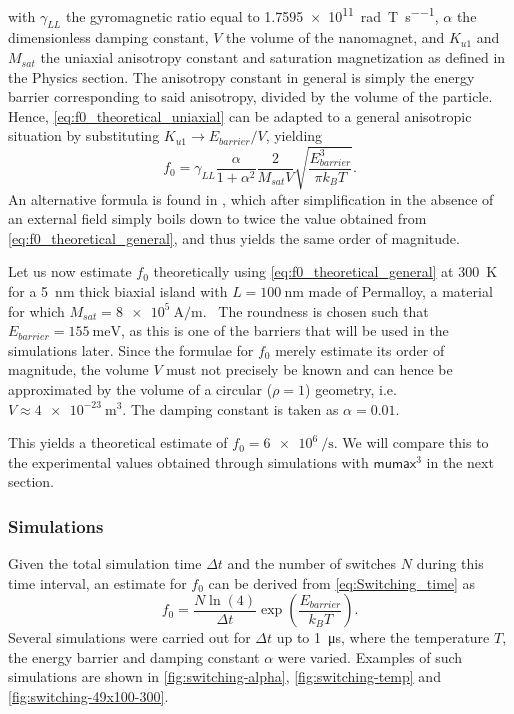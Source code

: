 \documentclass[12pt,a4paper]{article}
\newcommand{\mumax}{$\mathsf{mumax}^3$}
\begin{document}
with $\gamma_{LL}$ the gyromagnetic ratio equal to \SI{1.7595e11}{\radian\per\tesla\per\second}, $\alpha$ the dimensionless damping constant, $V$ the volume of the nanomagnet, and $K_{u1}$ and $M_{sat}$ the uniaxial anisotropy constant and saturation magnetization as defined in the Physics section. The anisotropy constant in general is simply the energy barrier corresponding to said anisotropy, divided by the volume of the particle. Hence, \cref{eq:f0_theoretical_uniaxial} can be adapted to a general anisotropic situation by substituting $K_{u1} \rightarrow E_{barrier}/V$, yielding
\begin{equation}
    f_0 = \gamma_{LL} \frac{\alpha}{1+\alpha^2} \frac{2}{M_{sat} V} \sqrt{\frac{E_{barrier}^3}{\pi k_B T}} \mathrm{.}
    \label{eq:f0_theoretical_general}
\end{equation}
An alternative formula is found in \cite{f0_alternative_Jonathan}, which after simplification in the absence of an external field simply boils down to twice the value obtained from \cref{eq:f0_theoretical_general}, and thus yields the same order of magnitude. \par
Let us now estimate $f_0$ theoretically using \cref{eq:f0_theoretical_general} at \SI{300}{\kelvin} for a \SI{5}{\nano\metre} thick biaxial island with $L=\SI{100}{\nano\metre}$ made of Permalloy, a material for which $M_{sat}=\SI{8e5}{\ampere\per\metre}$.~\cite{MuMax3} The roundness is chosen such that $E_{barrier}=\SI{155}{\milli\electronvolt}$, as this is one of the barriers that will be used in the simulations later. Since the formulae for $f_0$ merely estimate its order of magnitude, the volume $V$ must not precisely be known and can hence be approximated by the volume of a circular ($\rho=1$) geometry, i.e. $V\approx\SI{4e-23}{\metre\cubed}$. The damping constant is taken as $\alpha=0.01$. \par
This yields a theoretical estimate of $f_0 = \SI{6e6}{\per\second}$. We will compare this to the experimental values obtained through simulations with \mumax{} in the next section.

\subsubsection{Simulations}
Given the total simulation time $\Delta t$ and the number of switches $N$ during this time interval, an estimate for $f_0$ can be derived from \cref{eq:Switching_time} as
\begin{equation}
    f_0 = \frac{N \ln(4)}{\Delta t} \exp(\frac{E_{barrier}}{k_B T}) \mathrm{.}
    \label{eq:f0_experimental}
\end{equation}
Several simulations were carried out for $\Delta t$ up to \SI{1}{\micro\second}, where the temperature $T$, the energy barrier and damping constant $\alpha$ were varied. Examples of such simulations are shown in \cref{fig:switching-alpha}, \cref{fig:switching-temp} and \cref{fig:switching-49x100-300}. \par
\end{document}
